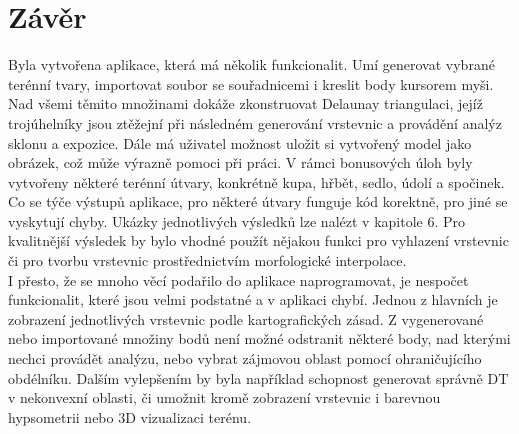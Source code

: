 \documentclass[a4paper,11pt,twoside]{article}
\begin{document}
\newpage
\vspace*{-1cm}
\section*{Závěr}
\noindent
\large
Byla vytvořena aplikace, která má několik funkcionalit. Umí generovat vybrané terénní tvary, importovat soubor se souřadnicemi i kreslit body kursorem myši. Nad všemi těmito množinami dokáže zkonstruovat Delaunay triangulaci, jejíž trojúhelníky jsou ztěžejní při následném generování vrstevnic a provádění analýz sklonu a expozice. Dále má uživatel možnost uložit si vytvořený model jako obrázek, což může výrazně pomoci při práci. V rámci bonusových úloh byly vytvořeny některé terénní útvary, konkrétně kupa, hřbět, sedlo, údolí a spočinek. Co se týče výstupů aplikace, pro některé útvary funguje kód korektně, pro jiné se vyskytují chyby. Ukázky jednotlivých výsledků lze nalézt v kapitole 6. Pro kvalitnější výsledek by bylo vhodné použít nějakou funkci pro vyhlazení vrstevnic či pro tvorbu vrstevnic prostřednictvím morfologické interpolace.\\
\indent I přesto, že se mnoho věcí podařilo do aplikace naprogramovat, je nespočet funkcionalit, které jsou velmi podstatné a v aplikaci chybí. Jednou z hlavních je zobrazení jednotlivých vrstevnic podle kartografických zásad. Z vygenerované nebo importované množiny bodů není možné odstranit některé body, nad kterými nechci provádět analýzu, nebo vybrat zájmovou oblast pomocí ohraničujícího obdélníku. Dalším vylepšením by byla například schopnost generovat správně DT v nekonvexní oblasti, či umožnit kromě zobrazení vrstevnic i barevnou hypsometrii nebo 3D vizualizaci terénu.




\newpage
\vspace*{-6ex}
\renewcommand{\refname}{Literatura} 
    
    
 
\end{document}

